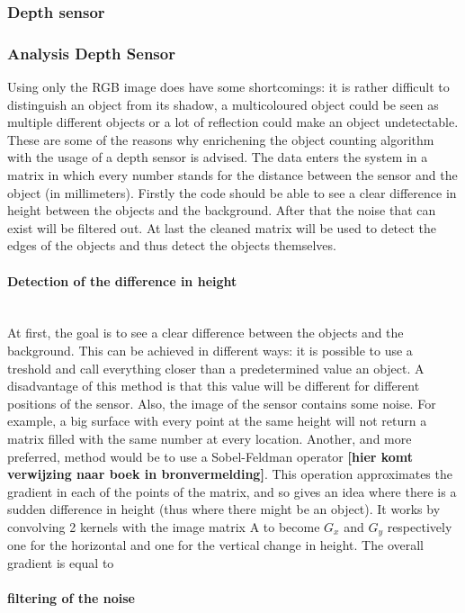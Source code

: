 \documentclass[11pt]{article}
\begin{document}
\subsubsection{Depth sensor}

\subsubsection{Analysis Depth Sensor}
Using only the RGB image does have some shortcomings: it is rather difficult to distinguish an object from its shadow, a multicoloured object could be seen as multiple different objects or a lot of reflection could make an object undetectable. These are some of the reasons why enrichening the object counting algorithm with the usage of a depth sensor is advised. The data enters the system in a matrix in which every number stands for the distance between the sensor and the object (in millimeters). Firstly the code should be able to see a clear difference in height between the objects and the background. After that the noise that can exist will be filtered out. At last the cleaned matrix will be used to detect the edges of the objects and thus detect the objects themselves.
 
\paragraph{Detection of the difference in height}\mbox{}\\
At first, the goal is to see a clear difference between the objects and the background. This can be achieved in different ways: it is possible to use a treshold and call everything closer than a predetermined value an object. A disadvantage of this method is that this value will be different for different positions of the sensor. Also, the image of the sensor contains some noise. For example, a big surface with every point at the same height will not return a matrix filled with the same number at every location. Another, and more preferred, method would be to use a Sobel-Feldman operator \textbf{[hier komt verwijzing naar boek in bronvermelding]}. This operation approximates the gradient in each of the points of the matrix, and so gives an idea where there is a sudden difference in height (thus where there might be an object). It works by convolving 2 kernels with the image matrix A to become $G_{x}$ and $G_{y}$ respectively one for the horizontal and one for the vertical change in height. The overall gradient is equal to 
\paragraph{filtering of the noise}\mbox{}\\
\end{document}
